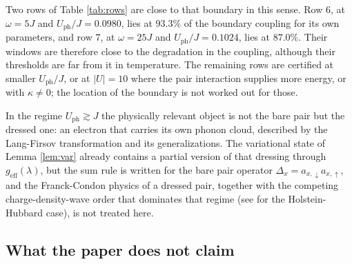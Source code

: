 \documentclass[11pt]{article}
\numberwithin{equation}{section}
\newcommand{\eff}{\mathrm{eff}}
\theoremstyle{definition}
\begin{document}
Two rows of Table \ref{tab:rows} are close to that boundary in this sense. Row 6, at
$\omega=5J$ and $U_{\mathrm{ph}}/J=0.0980$, lies at $93.3\%$ of the boundary coupling for
its own parameters, and row 7, at $\omega=25J$ and $U_{\mathrm{ph}}/J=0.1024$, lies at
$87.0\%$. Their windows are therefore close to the degradation in the coupling, although
their thresholds are far from it in temperature. The remaining rows are certified at
smaller $U_{\mathrm{ph}}/J$, or at $|U|=10$ where the pair interaction supplies more
energy, or with $\kappa\ne0$; the location of the boundary is not worked out for those.

In the regime $U_{\mathrm{ph}}\gtrsim J$ the physically relevant object is not the bare
pair but the dressed one: an electron that carries its own phonon cloud, described by the
Lang-Firsov transformation \cite{langfirsov1963} and its generalizations. The variational
state of Lemma \ref{lem:var} already contains a partial version of that dressing through
$g_{\eff}(\lambda)$, but the sum rule is written for the bare pair operator
$\Delta_{x}=a_{x,\downarrow}a_{x,\uparrow}$, and the Franck-Condon physics of a dressed pair,
together with the competing charge-density-wave order that dominates that regime (see
\cite{miyao2016} for the Holstein-Hubbard case), is not treated here.

\subsection{What the paper does not claim}
\end{document}
